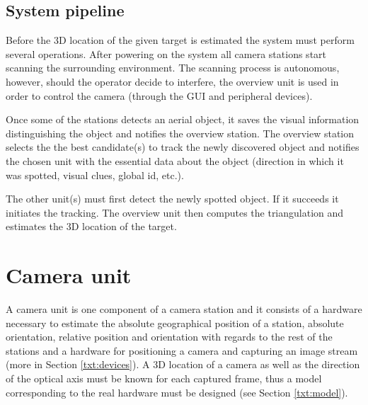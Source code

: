 \begin{figure}[htb]
\begin{minipage}{.48\textwidth}
		\label{fig:spilberk_camera_units}
	\end{minipage}
\end{figure}

\section{System pipeline}

Before the 3D location of the given target is estimated the system must perform several operations. After powering on the system all camera stations start scanning the surrounding environment. The scanning process is autonomous, however, should the operator decide to interfere, the overview unit is used in order to control the camera (through the GUI and peripheral devices). 

Once some of the stations detects an aerial object, it saves the visual information distinguishing the object and notifies the overview station. The overview station selects the the best candidate(s) to track the newly discovered object and notifies the chosen unit with the essential data about the object (direction in which it was spotted, visual clues, global id, etc.).

The other unit(s) must first detect the newly spotted object. If it succeeds it initiates the tracking. The overview unit then computes the triangulation and estimates the 3D location of the target.


\chapter{Camera unit} \label{txt:camera_unit}

A camera unit is one component of a camera station and it consists of a hardware necessary to estimate the absolute geographical position of a station, absolute orientation, relative position and orientation with regards to the rest of the stations and a hardware for positioning a camera and capturing an image stream (more in Section \ref{txt:devices}). A 3D location of a camera as well as the direction of the optical axis must be known for each captured frame, thus a model corresponding to the real hardware must be designed (see Section \ref{txt:model}).

